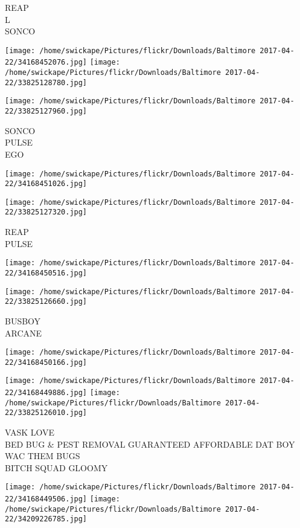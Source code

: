 \documentclass[10pt,letterpaper]{article}
\begin{document}
REAP\\
L\\
SONCO
\pagebreak

\texttt{[image: /home/swickape/Pictures/flickr/Downloads/Baltimore 2017-04-22/34168452076.jpg]}
\texttt{[image: /home/swickape/Pictures/flickr/Downloads/Baltimore 2017-04-22/33825128780.jpg]}

\vspace{0.25in}
\texttt{[image: /home/swickape/Pictures/flickr/Downloads/Baltimore 2017-04-22/33825127960.jpg]}

SONCO\\
PULSE\\
EGO
\pagebreak

\texttt{[image: /home/swickape/Pictures/flickr/Downloads/Baltimore 2017-04-22/34168451026.jpg]}

\vspace{0.25in}
\texttt{[image: /home/swickape/Pictures/flickr/Downloads/Baltimore 2017-04-22/33825127320.jpg]}

REAP\\
PULSE
\pagebreak

\texttt{[image: /home/swickape/Pictures/flickr/Downloads/Baltimore 2017-04-22/34168450516.jpg]}

\vspace{0.25in}
\texttt{[image: /home/swickape/Pictures/flickr/Downloads/Baltimore 2017-04-22/33825126660.jpg]}

BUSBOY\\
ARCANE
\pagebreak

\texttt{[image: /home/swickape/Pictures/flickr/Downloads/Baltimore 2017-04-22/34168450166.jpg]}

\vspace{0.25in}
\texttt{[image: /home/swickape/Pictures/flickr/Downloads/Baltimore 2017-04-22/34168449886.jpg]}
\texttt{[image: /home/swickape/Pictures/flickr/Downloads/Baltimore 2017-04-22/33825126010.jpg]}

VASK LOVE\\
BED BUG \& PEST REMOVAL GUARANTEED AFFORDABLE DAT BOY WAC THEM BUGS\\
BITCH SQUAD GLOOMY
\pagebreak

\texttt{[image: /home/swickape/Pictures/flickr/Downloads/Baltimore 2017-04-22/34168449506.jpg]}
\texttt{[image: /home/swickape/Pictures/flickr/Downloads/Baltimore 2017-04-22/34209226785.jpg]}
\end{document}
